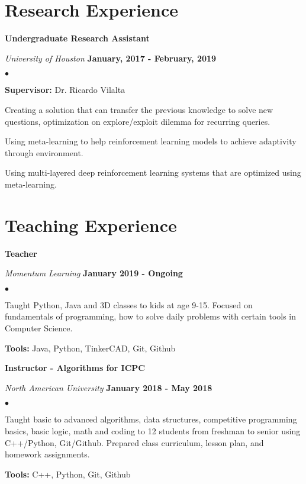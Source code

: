 \documentclass[margin,line]{res}
\newenvironment{list2}{
	\begin{list}{$\bullet$}{%
			\setlength{\itemsep}{0in}
			\setlength{\parsep}{0in} \setlength{\parskip}{0in}
			\setlength{\topsep}{0in} \setlength{\partopsep}{0in} 
			\setlength{\leftmargin}{0.2in}}}{\end{list}}
\begin{document}
\begin{resume}
		
		\section{\sc Research Experience}
		
		{\bf Undergraduate Research Assistant}
		
		\vspace{-.3cm}
		{\em University of Houston} \hfill {\bf January, 2017 - February, 2019}\\ 
		\vspace{-.3cm}
		\begin{list2}
			\item \textbf{Supervisor:} Dr. Ricardo Vilalta
			\item Creating a solution that can transfer the previous knowledge to solve new questions, optimization on explore/exploit dilemma for recurring queries. 
			\item Using meta-learning to help reinforcement learning models to achieve adaptivity through environment. 
			\item Using multi-layered deep reinforcement learning systems that are optimized using meta-learning. 
		\end{list2}
		
		\section{\sc Teaching Experience}
		{\bf Teacher}
		
		\vspace{-.3cm}
		{\em Momentum Learning} \hfill {\bf January 2019 - Ongoing}\\
		\begin{list2}
			\item Taught Python, Java and 3D classes to kids at age 9-15. Focused on fundamentals of programming, how to solve daily problems with certain tools in Computer Science.
			\item \textbf{Tools:} Java, Python, TinkerCAD, Git, Github
		\end{list2}
		\vspace*{.05in}
		
		{\bf Instructor - Algorithms for ICPC}
		
		\vspace{-.3cm}
		{\em North American University} \hfill {\bf January 2018 - May 2018}\\
		\begin{list2}
			\item Taught basic to advanced algorithms, data structures, competitive programming basics, basic logic, math and coding to 12 students from freshman to senior using C++/Python, Git/Github. Prepared class curriculum, lesson plan, and homework assignments.
			\item \textbf{Tools:} C++, Python, Git, Github
		\end{list2}
		\vspace*{.05in}
		

\end{resume}
\end{document}
